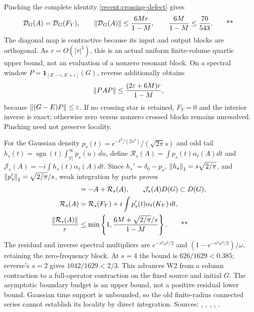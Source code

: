 Pinching the complete identity \eqref{recent:crossing-defect} gives
\begin{equation}
 \mathcal D_G(A)=\mathcal D_G(F_Y),\qquad
 \left\lVert \mathcal D_G(A)\right\rVert\le\frac{6Mr}{1-M},\qquad
 \frac{6M}{1-M}\le\frac{70}{543}. \qquad\text{**}
 \label{recent:ab-resonance}
\end{equation}
The diagonal map is contractive because its input and output blocks are
orthogonal.  As $r=O(|\tau|^3)$, this is an actual uniform finite-volume quartic
upper bound, not an evaluation of a nonzero resonant block.  On a spectral window
$P=\mathbf1_{[E-\varepsilon,E+\varepsilon]}(G)$, reverse additionally obtains
\begin{equation}
 \left\lVert PAP\right\rVert\le\frac{(2\varepsilon+6M)r}{1-M},
 \label{recent:ab-window}
\end{equation}
because $\left\lVert (G-E)P\right\rVert\le\varepsilon$.  If no crossing star is retained,
$F_Y=0$ and the interior inverse is exact; otherwise zero versus nonzero crossed
blocks remains unresolved.  Pinching need not preserve locality.

For the Gaussian density $p_s(t)=e^{-t^2/(2s^2)}/(\sqrt{2\pi}s)$ and odd tail
$h_s(t)=\operatorname{sgn}(t)\int_{|t|}^\infty p_s(u)\,du$, define
$\mathcal R_s(A)=\int p_s(t)\alpha_t(A)dt$ and
$\mathcal J_s(A)=-i\int h_s(t)\alpha_t(A)dt$.  Since
$h_s'=\delta_0-p_s$, $\left\lVert h_s\right\rVert_1=s\sqrt{2/\pi}$, and
$\left\lVert p_s'\right\rVert_1=\sqrt{2/\pi}/s$, weak integration by parts proves
\begin{align}
 [\mathcal J_s(A),G]&=-A+\mathcal R_s(A),\qquad
 \mathcal J_s(A)D(G)\subset D(G),\notag\\
 \mathcal R_s(A)&=\mathcal R_s(F_Y)+i\int p_s'(t)\alpha_t(K_Y)\,dt,\notag\\
 \frac{\norm{\mathcal R_s(A)}}r
 &\le\min\left\{1,\frac{6M+\sqrt{2/\pi}/s}{1-M}\right\}. \qquad\text{\workstar}
 \label{recent:gaussian-contraction}
\end{align}
The residual and inverse spectral multipliers are
$e^{-s^2\omega^2/2}$ and $(1-e^{-s^2\omega^2/2})/\omega$, retaining the
zero-frequency block.  At $s=4$ the bound is $626/1629<0.385$; reverse's $s=2$
gives $1042/1629<2/3$.  This advances W2 from a column contraction to a
full-operator contraction on the fixed source and initial $G$.  The asymptotic
boundary budget is an upper bound, not a positive residual lower bound.
Gaussian time support is unbounded, so the old finite-radius connected series
cannot establish its locality by direct integration.
Sources: ,
,
,
,
.

